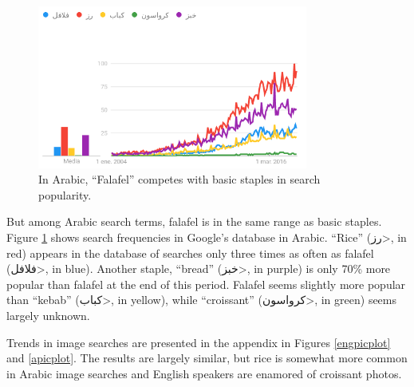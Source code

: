 \documentclass[a4paper,10pt]{article}
\begin{document}
\begin{figure}
\begin{center}
\includegraphics[width=3.5in]{atrends.png}
\end{center}
\caption{In Arabic, ``Falafel'' competes with basic staples in search popularity.}
\label{aplot}
\end{figure}

But among Arabic search terms, falafel is in the same range as basic staples. 
Figure \ref{aplot} shows search frequencies in Google's database in Arabic.
``Rice'' (\<رز>, in red) appears in the database of searches only three times as often as
falafel (\<فلافل>, in blue).  Another staple, ``bread'' (\<خبز>, in purple) is only 70\% more
popular than falafel at the end of this period. Falafel seems slightly more popular than ``kebab'' (\<كباب>,
in yellow), while ``croissant'' (\<كرواسون>, in green) seems largely unknown.

Trends in image searches are presented in the appendix in Figures \ref{engpicplot} and \ref{apicplot}.
The results are largely similar, but rice is somewhat more common in Arabic image searches
and English speakers are enamored of croissant photos.
\end{document}

